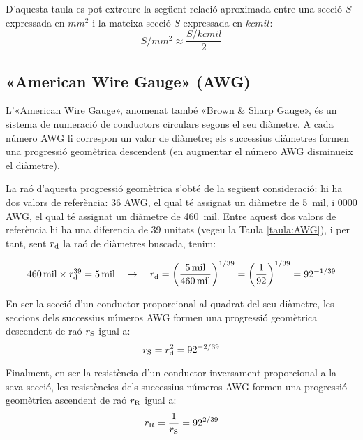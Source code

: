 D'aquesta taula es pot extreure la següent relació aproximada entre una secció $S$ expressada en $\si{mm^2}$ i la mateixa secció $S$ expressada en $\si{kcmil}$:
\begin{equation}
  S/{\scriptstyle\si{mm^2}} \approx \frac{ S/{\scriptstyle\si{kcmil}}}{2}
\end{equation}



\subsection{«American Wire Gauge» (AWG)}\label{sec:awg}

L'«American Wire Gauge», anomenat també «Brown \& Sharp Gauge», és un sistema de numeració de conductors circulars segons el seu diàmetre. A cada número AWG li correspon un valor de diàmetre; els successius diàmetres formen una progressió geomètrica descendent (en augmentar el número AWG disminueix el diàmetre).

La raó d'aquesta progressió geomètrica s'obté de la següent consideració: hi ha dos valors de referència: 36 AWG, el qual té assignat un diàmetre de \SI{5}{mil}, i 0000 AWG, el qual té assignat un diàmetre de \SI{460}{mil}. Entre aquest dos valors de referència hi ha una diferencia de 39 unitats (vegeu la Taula \vref{taula:AWG}), i per tant, sent $r_\mathrm{d}$ la raó de diàmetres buscada, tenim:

\begin{equation}
   \SI{460}{mil} \times r_\mathrm{d}^{39} = \SI{5}{mil} \quad \rightarrow \quad r_\mathrm{d} = \left( \frac{\SI{5}{mil}}{\SI{460}{mil}} \right)^{1/39} = \left( \frac{1}{92} \right)^{1/39} = 92^{-1/39}
\end{equation}

En ser la secció d'un conductor proporcional al quadrat del seu diàmetre, les seccions dels successius números AWG formen una progressió geomètrica  descendent de raó $r_\mathrm{S}$ igual a: \begin{equation}
   r_\mathrm{S} = r_\mathrm{d}^2 = 92^{-2/39}
\end{equation}

Finalment, en ser la resistència d'un conductor inversament proporcional a la seva secció, les resistències dels successius números AWG formen una progressió geomètrica ascendent de raó $r_\mathrm{R}$ igual a:
\begin{equation}
   r_\mathrm{R} = \frac{1}{r_\mathrm{S}} = 92^{2/39}
\end{equation}

